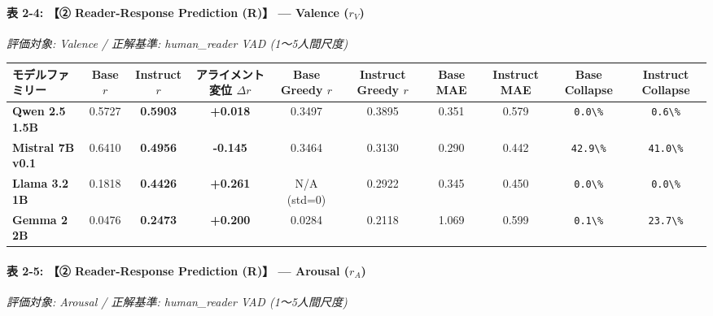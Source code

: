 \paragraph{表 2-4: 【② Reader-Response Prediction (R)】 — Valence ($r_V$)}
\textit{評価対象: Valence / 正解基準: human\_reader VAD (1〜5人間尺度)}

\begin{center}
\small
\begin{tabular}{lccccccccc}
\toprule
\textbf{モデルファミリー} & \textbf{Base $r$} & \textbf{Instruct $r$} & \textbf{アライメント変位 $\Delta r$} & \textbf{Base Greedy $r$} & \textbf{Instruct Greedy $r$} & \textbf{Base MAE} & \textbf{Instruct MAE} & \textbf{Base Collapse} & \textbf{Instruct Collapse} \\
\midrule
\textbf{Qwen 2.5 1.5B} & 0.5727 & \textbf{0.5903} & \textbf{+0.018} & 0.3497 & 0.3895 & 0.351 & 0.579 & \texttt{0.0\textbackslash{}\%} & \texttt{0.6\textbackslash{}\%} \\
\textbf{Mistral 7B v0.1} & 0.6410 & \textbf{0.4956} & \textbf{-0.145} & 0.3464 & 0.3130 & 0.290 & 0.442 & \texttt{42.9\textbackslash{}\%} & \texttt{41.0\textbackslash{}\%} \\
\textbf{Llama 3.2 1B} & 0.1818 & \textbf{0.4426} & \textbf{+0.261} & N/A (std=0) & 0.2922 & 0.345 & 0.450 & \texttt{0.0\textbackslash{}\%} & \texttt{0.0\textbackslash{}\%} \\
\textbf{Gemma 2 2B} & 0.0476 & \textbf{0.2473} & \textbf{+0.200} & 0.0284 & 0.2118 & 1.069 & 0.599 & \texttt{0.1\textbackslash{}\%} & \texttt{23.7\textbackslash{}\%} \\
\bottomrule
\end{tabular}
\end{center}


\paragraph{表 2-5: 【② Reader-Response Prediction (R)】 — Arousal ($r_A$)}
\textit{評価対象: Arousal / 正解基準: human\_reader VAD (1〜5人間尺度)}

